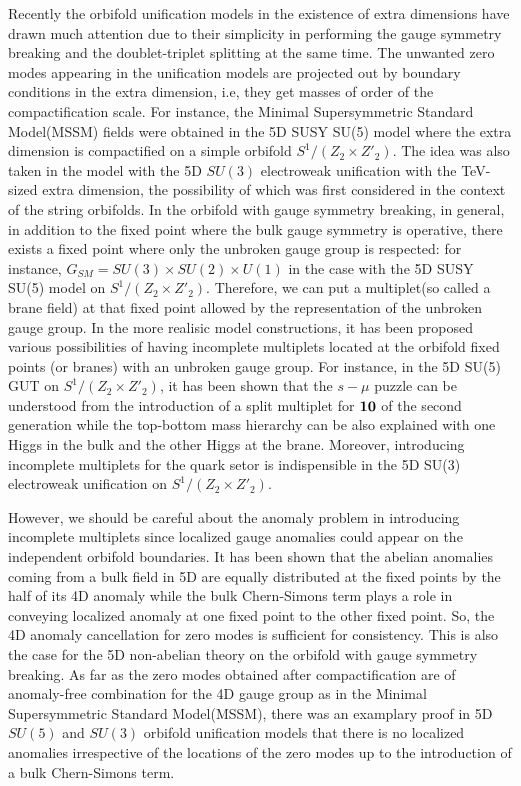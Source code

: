 \documentclass[a4paper,12pt]{article}
\begin{document}
Recently the orbifold unification models in the existence of extra dimensions 
have 
drawn much attention due to their simplicity in performing the gauge symmetry 
breaking and the doublet-triplet splitting at the same time. 
The unwanted zero modes appearing in the unification models are projected out 
by boundary conditions in the extra dimension, i.e,  they get masses of order 
of the compactification scale. 
For instance,
the Minimal Supersymmetric Standard Model(MSSM) fields were obtained 
in the 5D SUSY SU(5) model where the extra dimension is compactified 
on a simple orbifold $S^1/(Z_2\times Z'_2)$\cite{kawamura,pointgroup,kkl0}. 
The idea was also taken in the model with the 5D $SU(3)$ electroweak 
unification with the TeV-sized extra dimension\cite{su3,kkl}, the possibility 
of which was first considered in the context of the string 
orbifolds\cite{anton}.
In the orbifold with gauge symmetry breaking, in general, 
in addition to the fixed point where the bulk gauge symmetry is operative, 
there exists a fixed point where only the unbroken gauge group is 
respected\cite{pointgroup}: for instance,
$G_{SM}=SU(3)\times SU(2)\times U(1)$ in the case with the 5D SUSY SU(5) model
on $S^1/(Z_2\times Z'_2)$.  
Therefore, 
we can put a multiplet(so called a brane field) at that fixed point 
allowed by the representation of
the unbroken gauge group. 
In the more
realisic model constructions, it has been proposed various possibilities
of having incomplete multiplets located at the orbifold fixed points
(or branes) with an unbroken gauge group\cite{pointgroup,kkl0,su3,kkl}.
For instance, in the 5D SU(5) GUT on $S^1/(Z_2\times Z'_2)$,
it has been shown that the $s-\mu$ puzzle can be understood
from the introduction of a split multiplet for $\bf 10$ of the second 
generation\cite{kkl0}
while the top-bottom mass hierarchy can be also explained with one Higgs in the
bulk and the other Higgs at the brane\cite{kkl0,kkl}. 
Moreover, introducing incomplete
multiplets for the quark setor is indispensible in the 5D SU(3) electroweak
unification on $S^1/(Z_2\times Z'_2)$\cite{su3,kkl}.

However, we should be careful about the anomaly problem in introducing
incomplete multiplets since localized gauge anomalies could appear on the
independent orbifold boundaries\cite{scrucca,pilo,barbieri,scrucca2,kkl,nilles}.
It has been shown\cite{ah} that the abelian anomalies coming from a bulk 
field in 5D
are equally distributed at the fixed points by the half of its 4D anomaly
while the bulk Chern-Simons term\cite{ch} plays a role
in conveying localized anomaly at one fixed point 
to the other fixed point.
So, the 4D anomaly cancellation for zero modes is sufficient
for consistency. This is also the case for the 5D non-abelian theory on the
orbifold with gauge symmetry breaking.
As far as the zero modes obtained after compactification are of anomaly-free
combination for the 4D gauge group as in the Minimal Supersymmetric Standard
Model(MSSM),
there was an examplary proof in 5D $SU(5)$ and $SU(3)$ orbifold unification 
models\cite{kkl}
that there is no localized anomalies
irrespective of the locations of the zero modes up to the introduction
of a bulk Chern-Simons term.
\end{document}
